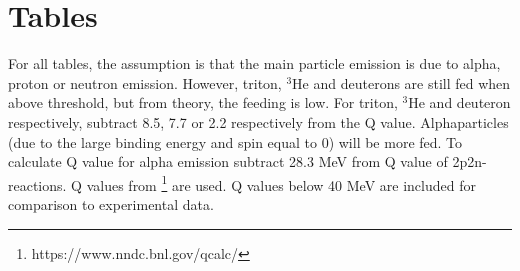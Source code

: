 
\chapter{Tables} \label{ch_app:tables}

For all tables, the assumption is that the main particle emission is due to alpha, proton or neutron emission. However, triton, $^3$He and deuterons are still fed when above threshold, but from theory, the feeding is low. For triton, $^{3}$He and deuteron respectively, subtract 8.5, 7.7 or 2.2 respectively from the Q value. Alphaparticles (due to the large binding energy and spin equal to 0) will be more fed. To calculate Q value for alpha emission subtract 28.3 MeV from Q value of 2p2n-reactions. Q values from  \footnote{https://www.nndc.bnl.gov/qcalc/} are used. Q values below 40 MeV are included for comparison to experimental data. 

